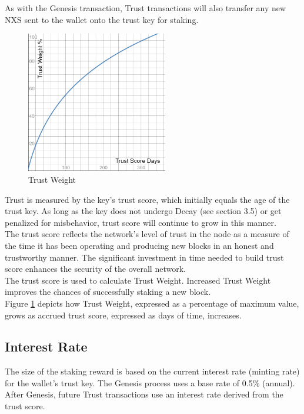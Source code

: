 \documentclass[11pt]{article}
\begin{document}
\noindent As with the Genesis transaction, Trust transactions will also transfer any new NXS sent to the wallet onto the trust key for staking. \\

\begin{figure}
    \centering
    \includegraphics[width=0.55\textwidth]{images/trustWeight.png}
    \caption{Trust Weight \label{fig:trustWeight}}
\end{figure}

\noindent Trust is measured by the key’s trust score, which initially equals the age of the trust key. As long as the key does not undergo Decay (see section 3.5) or get penalized for misbehavior, trust score will continue to grow in this manner.\\

\noindent The trust score reflects the network’s level of trust in the node as a measure of the time it has been operating and producing new blocks in an honest and trustworthy manner. The significant investment in time needed to build trust score enhances the security of the overall network.\\

\noindent The trust score is used to calculate Trust Weight. Increased Trust Weight improves the chances of successfully staking a new block.\\

\noindent Figure \ref{fig:trustWeight} depicts how Trust Weight, expressed as a percentage of maximum value, grows as accrued trust score, expressed as days of time, increases.\\

\subsection{Interest Rate}
The size of the staking reward is based on the current interest rate (minting rate) for the wallet’s trust key. The Genesis process uses a base rate of 0.5\% (annual). After Genesis, future Trust transactions use an interest rate derived from the trust score.\\
\end{document}

